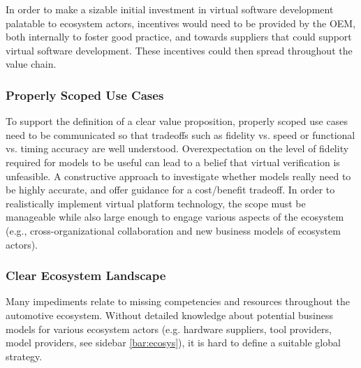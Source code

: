In order to make a sizable initial investment in virtual software development palatable to ecosystem actors,
incentives would need to be provided by the OEM,
both internally to foster good practice, and towards suppliers that could support virtual software development.
These incentives could then spread throughout the value chain.

\subsubsection*{Properly Scoped Use Cases}
To support the definition of a clear value proposition,
properly scoped use cases need to be  communicated so that tradeoffs such as fidelity vs. speed or functional vs. timing accuracy are well understood.
Overexpectation on the level of fidelity required for models to be useful can lead to a belief that virtual verification is unfeasible.
A constructive approach  to investigate whether models really need to be highly accurate, and offer guidance for a cost/benefit tradeoff.
In order to realistically implement virtual platform technology,
the scope must be manageable while also large enough to engage various aspects of the ecosystem
(e.g., cross-organizational collaboration and new business models of ecosystem actors).

\subsubsection*{Clear Ecosystem Landscape}
Many impediments relate to missing competencies and resources throughout the automotive ecosystem. 
Without detailed knowledge about potential business models for various ecosystem actors (e.g. hardware suppliers, tool providers, model providers, see sidebar \ref{bar:ecosys}), it is hard to define a suitable global strategy. 



